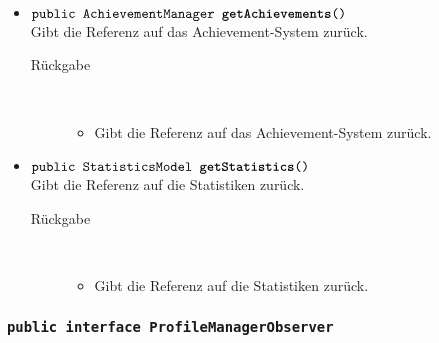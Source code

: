 \begin{description}
\begin{itemize}
		\item $\texttt{public AchievementManager \textbf{getAchievements}()}$ \\ Gibt die Referenz auf das Achievement-System zurück.
		\begin{description}
			\item[Rückgabe] \hfill \\
			\vspace{-.8cm}
			\begin{itemize}
				\item Gibt die Referenz auf das Achievement-System zurück.
			\end{itemize}
		\end{description}
		
		\item $\texttt{public StatisticsModel \textbf{getStatistics}()}$ \\ Gibt die Referenz auf die Statistiken zurück.
		\begin{description}
			\item[Rückgabe] \hfill \\
			\vspace{-.8cm}
			\begin{itemize}
				\item Gibt die Referenz auf die Statistiken zurück.
			\end{itemize}
		\end{description}
	\end{itemize}
\end{description}

\subsubsection{\normalfont \texttt{public interface \textbf{ProfileManagerObserver}}}

